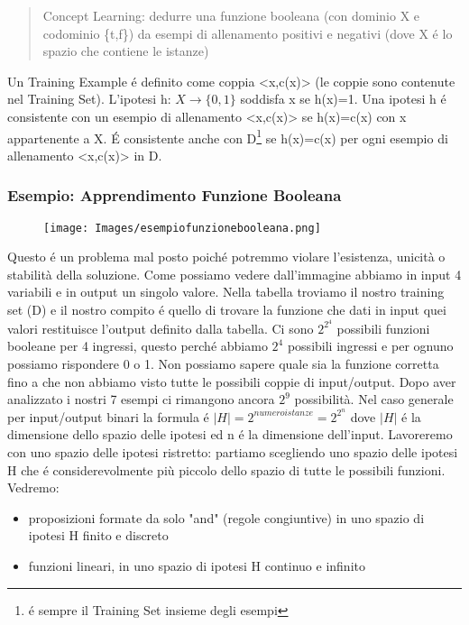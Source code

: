 \documentclass{article}
\begin{document}
\begin{quote}
    Concept Learning: dedurre una funzione booleana (con dominio X e codominio \{t,f\}) da esempi di allenamento positivi e negativi (dove X é lo spazio che contiene le istanze)
\end{quote}
Un Training Example é definito come coppia <x,c(x)> (le coppie sono contenute nel Training Set). \newline
L'ipotesi h: $X \rightarrow \{0,1\}$ soddisfa x se h(x)=1. \newline
Una ipotesi h é consistente con un esempio di allenamento <x,c(x)> se h(x)=c(x) con x appartenente a X. É consistente anche con D\footnote{é sempre il Training Set insieme degli esempi} se h(x)=c(x) per ogni esempio di allenamento <x,c(x)> in D.
\clearpage

\subsubsection{Esempio: Apprendimento Funzione Booleana}
\begin{figure}[H]
    \centering
    \texttt{[image: Images/esempiofunzionebooleana.png]}
\end{figure}
Questo é un problema mal posto poiché potremmo violare l'esistenza, unicità o stabilità della soluzione. Come possiamo vedere dall'immagine abbiamo in input 4 variabili e in output un singolo valore. Nella tabella troviamo il nostro training set (D) e il nostro compito é quello di trovare la funzione che dati in input quei valori restituisce l'output definito dalla tabella. Ci sono $2^{2^4}$ possibili funzioni booleane per 4 ingressi, questo perché abbiamo $2^4$ possibili ingressi e per ognuno possiamo rispondere 0 o 1. Non possiamo sapere quale sia la funzione corretta fino a che non abbiamo visto tutte le possibili coppie di input/output. Dopo aver analizzato i nostri 7 esempi ci rimangono ancora $2^9$ possibilità. Nel caso generale per input/output binari la formula é $|H| = 2^{numeroistanze} = 2^{2^n}$ dove $|H|$ é la dimensione dello spazio delle ipotesi ed n é la dimensione dell'input. \newline
Lavoreremo con uno spazio delle ipotesi ristretto: partiamo scegliendo uno spazio delle ipotesi H che é considerevolmente più piccolo dello spazio di tutte le possibili funzioni. \newline Vedremo: 
\begin{itemize}
    \item proposizioni formate da solo "and" (regole congiuntive) in uno spazio di ipotesi H finito e discreto
    \item funzioni lineari, in uno spazio di ipotesi H continuo e infinito
\end{itemize}
\end{document}
